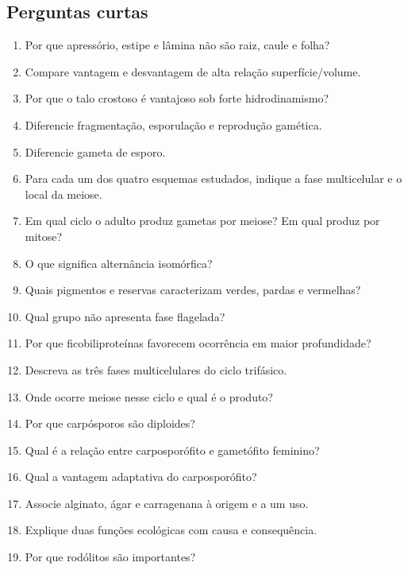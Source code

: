 \documentclass[12pt,a4paper]{article}
\begin{document}
\subsection{Perguntas curtas}
\begin{enumerate}
\item Por que apressório, estipe e lâmina não são raiz, caule e folha?
\item Compare vantagem e desvantagem de alta relação superfície/volume.
\item Por que o talo crostoso é vantajoso sob forte hidrodinamismo?
\item Diferencie fragmentação, esporulação e reprodução gamética.
\item Diferencie gameta de esporo.
\item Para cada um dos quatro esquemas estudados, indique a fase multicelular
e o local da meiose.
\item Em qual ciclo o adulto produz gametas por meiose? Em qual produz por
mitose?
\item O que significa alternância isomórfica?
\item Quais pigmentos e reservas caracterizam verdes, pardas e vermelhas?
\item Qual grupo não apresenta fase flagelada?
\item Por que ficobiliproteínas favorecem ocorrência em maior profundidade?
\item Descreva as três fases multicelulares do ciclo trifásico.
\item Onde ocorre meiose nesse ciclo e qual é o produto?
\item Por que carpósporos são diploides?
\item Qual é a relação entre carposporófito e gametófito feminino?
\item Qual a vantagem adaptativa do carposporófito?
\item Associe alginato, ágar e carragenana à origem e a um uso.
\item Explique duas funções ecológicas com causa e consequência.
\item Por que rodólitos são importantes?
\end{enumerate}
\end{document}
